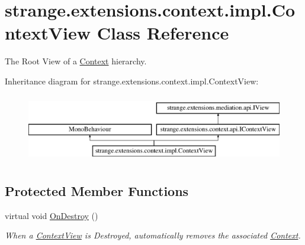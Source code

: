 \hypertarget{classstrange_1_1extensions_1_1context_1_1impl_1_1_context_view}{\section{strange.\-extensions.\-context.\-impl.\-Context\-View Class Reference}
\label{classstrange_1_1extensions_1_1context_1_1impl_1_1_context_view}
}


The Root View of a \hyperlink{classstrange_1_1extensions_1_1context_1_1impl_1_1_context}{Context} hierarchy.  


Inheritance diagram for strange.\-extensions.\-context.\-impl.\-Context\-View\-:\begin{figure}[H]
\begin{center}
\leavevmode
\includegraphics[height=3.000000cm]{classstrange_1_1extensions_1_1context_1_1impl_1_1_context_view}
\end{center}
\end{figure}
\subsection*{Protected Member Functions}
\begin{DoxyCompactItemize}
\item 
virtual void \hyperlink{classstrange_1_1extensions_1_1context_1_1impl_1_1_context_view_a3a41e584731cc8e98f478427e2710d9a}{On\-Destroy} ()
\begin{DoxyCompactList}\small\item\em When a \hyperlink{classstrange_1_1extensions_1_1context_1_1impl_1_1_context_view}{Context\-View} is Destroyed, automatically removes the associated \hyperlink{classstrange_1_1extensions_1_1context_1_1impl_1_1_context}{Context}. \end{DoxyCompactList}\end{DoxyCompactItemize}
